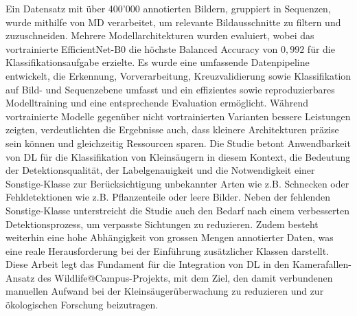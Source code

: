 Ein Datensatz mit über 400'000 annotierten Bildern, gruppiert in Sequenzen, wurde mithilfe von \ac{MD} verarbeitet, um relevante Bildausschnitte zu filtern und zuzuschneiden.
Mehrere Modellarchitekturen wurden evaluiert, wobei das vortrainierte EfficientNet-B0 die höchste Balanced Accuracy von \(0{,}992\) für die Klassifikationsaufgabe erzielte.
Es wurde eine umfassende Datenpipeline entwickelt, die Erkennung, Vorverarbeitung, Kreuzvalidierung sowie Klassifikation auf Bild- und Sequenzebene umfasst und ein effizientes sowie reproduzierbares Modelltraining und eine entsprechende Evaluation ermöglicht.
Während vortrainierte Modelle gegenüber nicht vortrainierten Varianten bessere Leistungen zeigten, verdeutlichten die Ergebnisse auch, dass kleinere Architekturen präzise sein können und gleichzeitig Ressourcen sparen.
Die Studie betont Anwendbarkeit von \ac{DL} für die Klassifikation von Kleinsäugern in diesem Kontext, die Bedeutung der Detektionsqualität, der Labelgenauigkeit und die Notwendigkeit einer Sonstige-Klasse zur Berücksichtigung unbekannter Arten wie z.B. Schnecken oder Fehldetektionen wie z.B. Pflanzenteile oder leere Bilder.
Neben der fehlenden Sonstige-Klasse unterstreicht die Studie auch den Bedarf nach einem verbesserten Detektionsprozess, um verpasste Sichtungen zu reduzieren.
Zudem besteht weiterhin eine hohe Abhängigkeit von grossen Mengen annotierter Daten, was eine reale Herausforderung bei der Einführung zusätzlicher Klassen darstellt.
Diese Arbeit legt das Fundament für die Integration von \ac{DL} in den Kamerafallen-Ansatz des Wildlife@Campus-Projekts, mit dem Ziel, den damit verbundenen manuellen Aufwand bei der Kleinsäugerüberwachung zu reduzieren und zur ökologischen Forschung beizutragen.
\vspace*{\fill}